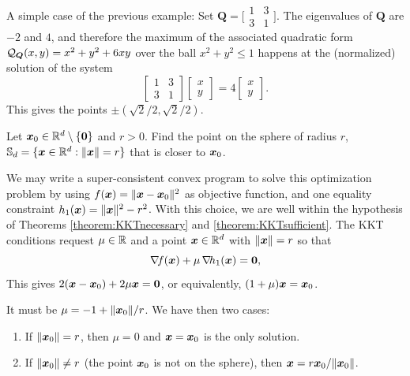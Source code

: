 \begin{example}
A simple case of the previous example: Set $\boldsymbol{Q} = \big[ \begin{smallmatrix} 1 & 3 \\ 3 & 1 \end{smallmatrix}\big]$.  The eigenvalues of $\boldsymbol{Q}$ are $-2$ and $4$, and therefore the maximum of the associated quadratic form $\mathcal{Q}_{\boldsymbol{Q}}(x,y) = x^2+y^2+6xy$ over the ball $x^2+y^2\leq 1$ happens at the (normalized) solution of the system
\begin{equation*}
\begin{bmatrix} 1 & 3 \\ 3 & 1 \end{bmatrix} \begin{bmatrix} x \\ y \end{bmatrix} = 4\begin{bmatrix} x \\ y \end{bmatrix}.
\end{equation*}
This gives the points $\pm(\sqrt{2}/2, \sqrt{2}/2)$.
\end{example}

\begin{example}
Let $\boldsymbol{x}_0 \in \mathbb{R}^d\setminus\{\boldsymbol{0}\}$ and $r>0$.  Find the point on the sphere of radius $r$, $\mathbb{S}_d=\{ \boldsymbol{x} \in \mathbb{R}^d: \lVert \boldsymbol{x} \rVert=r \}$ that is closer to $\boldsymbol{x}_0$. 

We may write a super-consistent convex program to solve this optimization problem by using $f(\boldsymbol{x})=\lVert \boldsymbol{x}-\boldsymbol{x}_0 \rVert^2$ as objective function, and one equality constraint $h_1(\boldsymbol{x})=\lVert \boldsymbol{x} \rVert^2-r^2$.  With this choice, we are well within the hypothesis of Theorems \ref{theorem:KKTnecessary} and \ref{theorem:KKTsufficient}.  The KKT conditions request $\mu \in \mathbb{R}$ and a point $\boldsymbol{x} \in \mathbb{R}^d$ with $\lVert \boldsymbol{x} \rVert = r$ so that
\begin{equation*} 
\mathop{\nabla\! {f}}(\boldsymbol{x}) + \mu\mathop{\nabla\! {h_1}}(\boldsymbol{x}) = \boldsymbol{0},
\end{equation*}
This gives $2(\boldsymbol{x}-\boldsymbol{x}_0)+2\mu\boldsymbol{x} = \boldsymbol{0}$, or equivalently, $(1+\mu)\boldsymbol{x} = \boldsymbol{x}_0$.

It must be $\mu = -1+\lVert \boldsymbol{x}_0 \rVert/r$.  We have then two cases:
\begin{enumerate}
	\item If $\lVert \boldsymbol{x}_0 \rVert=r$, then $\mu=0$ and $\boldsymbol{x}=\boldsymbol{x}_0$ is the only solution.
	\item If $\lVert \boldsymbol{x}_0 \rVert \neq r$ (the point $\boldsymbol{x}_0$ is not on the sphere), then $\boldsymbol{x} = r\boldsymbol{x}_0/\lVert \boldsymbol{x}_0 \rVert$.
\end{enumerate}
\end{example}

